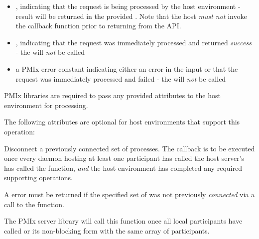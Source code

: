 \begin{itemize}
    \item {}, indicating that the request is being processed by the host environment - result will be returned in the provided . Note that the host \emph{must not} invoke the callback function prior to returning from the \ac{API}.
    \item {}, indicating that the request was immediately processed and returned \textit{success} - the  will \textit{not} be called
    \item a PMIx error constant indicating either an error in the input or that the request was immediately processed and failed - the  will \textit{not} be called
\end{itemize}

\reqattrstart
\ac{PMIx} libraries are required to pass any provided attributes to the host environment for processing.
\reqattrend

\optattrstart
The following attributes are optional for host environments that support this operation:


\optattrend

\descr

Disconnect a previously connected set of processes. The callback is to be executed once every daemon hosting at least one participant has called the host server's has called the  function, \textit{and} the host environment has completed any required supporting operations.

\advicermstart
A  error must be returned if the specified set of  was not previously \textit{connected} via a call to the  function.

The \ac{PMIx} server library will
call this function once all local participants have called  or its non-blocking form with the same array of participants.

\advicermend


\subsection{}

\summary

